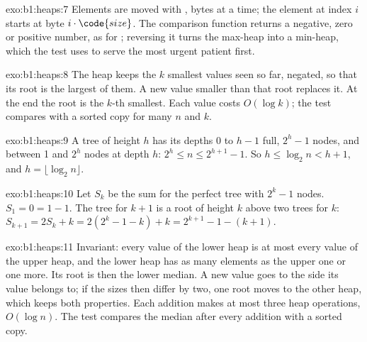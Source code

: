 \begin{solution}{exo:b1:heaps:7}
Elements are moved with ,  bytes at a time; the element at index $i$ starts at byte $i \cdot
\code{size}$. The comparison function returns a negative, zero or positive number, as for ; reversing it
turns the max-heap into a min-heap, which the test uses to serve the most urgent patient first.
\end{solution}

\begin{solution}{exo:b1:heaps:8}
The heap keeps the $k$ smallest values seen so far, negated, so that its root is the largest of them. A new value
smaller than that root replaces it. At the end the root is the $k$-th smallest. Each value costs $O(\log k)$; the test
compares with a sorted copy for many $n$ and $k$.
\end{solution}

\begin{solution}{exo:b1:heaps:9}
A  tree of height $h$ has its depths $0$ to $h - 1$ full, $2^h - 1$ nodes, and between 1 and $2^h$ nodes at depth
$h$: $2^h \leq n \leq 2^{h+1} - 1$. So $h \leq \log_2 n < h + 1$, and $h = \lfloor \log_2 n \rfloor$.
\end{solution}

\begin{solution}{exo:b1:heaps:10}
Let $S_k$ be the sum for the perfect tree with $2^k - 1$ nodes. $S_1 = 0 = 1 - 1$. The tree for $k + 1$ is a root of
height $k$ above two trees for $k$: $S_{k+1} = 2S_k + k = 2(2^k - 1 - k) + k = 2^{k+1} - 1 - (k + 1)$.
\end{solution}

\begin{solution}{exo:b1:heaps:11}
Invariant: every value of the lower heap is at most every value of the upper heap, and the lower heap has as many
elements as the upper one or one more. Its root is then the lower median. A new value goes to the side its value
belongs to; if the sizes then differ by two, one root moves to the other heap, which keeps both properties. Each
addition makes at most three heap operations, $O(\log n)$. The test compares the median after every addition with a
sorted copy.
\end{solution}

